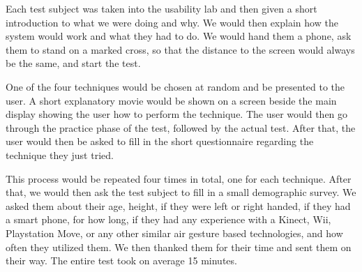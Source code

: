 Each test subject was taken into the usability lab and then given a short introduction to what we were doing and why. 
We would then explain how the system would work and what they had to do. 
We would hand them a phone, ask them to stand on a marked cross, so that the distance to the screen would always be the same, and start the test.

One of the four techniques would be chosen at random and be presented to the user. 
A short explanatory movie would be shown on a screen beside the main display showing the user how to perform the technique. 
The user would then go through the practice phase of the test, followed by the actual test. 
After that, the user would then be asked to fill in the short questionnaire regarding the technique they just tried. 

This process would be repeated four times in total, one for each technique. 
After that, we would then ask the test subject to fill in a small demographic survey. 
We asked them about their age, height, if they were left or right handed, if they had a smart phone, for how long, if they had any experience with a Kinect, Wii, Playstation Move, or any other similar air gesture based technologies, and how often they utilized them. 
We then thanked them for their time and sent them on their way. 
The entire test took on average 15 minutes. 